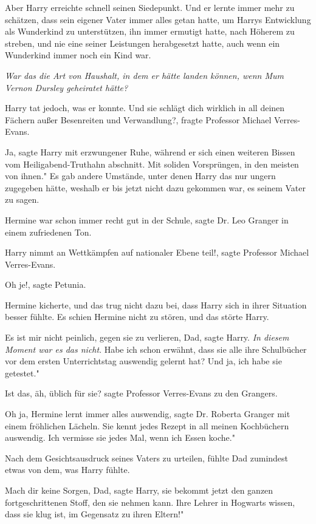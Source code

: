 Aber Harry erreichte schnell seinen Siedepunkt. Und er lernte immer mehr zu
schätzen, dass sein eigener Vater immer alles getan hatte, um Harrys Entwicklung
als Wunderkind zu unterstützen, ihn immer ermutigt hatte, nach Höherem zu
streben, und nie eine seiner Leistungen herabgesetzt hatte, auch wenn ein
Wunderkind immer noch ein Kind war.

\emph{War das die Art von Haushalt, in dem er hätte landen können, wenn Mum Vernon Dursley geheiratet hätte? }

Harry tat jedoch, was er konnte. \glqq Und sie schlägt dich wirklich in all
deinen Fächern außer Besenreiten und Verwandlung?\grqq{}, fragte Professor
Michael Verres-Evans.

\glqq Ja\grqq{}, sagte Harry mit erzwungener Ruhe, während er sich einen
weiteren Bissen vom Heiligabend-Truthahn abschnitt. \glqq Mit soliden
Vorsprüngen, in den meisten von ihnen." Es gab andere Umstände, unter denen
Harry das nur ungern zugegeben hätte, weshalb er bis jetzt nicht dazu gekommen
war, es seinem Vater zu sagen.

\glqq Hermine war schon immer recht gut in der Schule\grqq{}, sagte Dr. Leo
Granger in einem zufriedenen Ton.

\glqq Harry nimmt an Wettkämpfen auf nationaler Ebene teil!\grqq{}, sagte
Professor Michael Verres-Evans.

\glqq Oh je!\grqq{}, sagte Petunia.

Hermine kicherte, und das trug nicht dazu bei, dass Harry sich in ihrer
Situation besser fühlte. Es schien Hermine nicht zu stören, und das störte
Harry.

\glqq Es ist mir nicht peinlich, gegen sie zu verlieren, Dad\grqq{}, sagte
Harry.\emph{ In diesem Moment war es das nicht}. \glqq Habe ich schon erwähnt,
dass sie alle ihre Schulbücher vor dem ersten Unterrichtstag auswendig gelernt
hat? Und ja, ich habe sie getestet."

\glqq Ist das, äh, üblich für sie?\grqq{} sagte Professor Verres-Evans zu den
Grangers.

\glqq Oh ja, Hermine lernt immer alles auswendig\grqq{}, sagte Dr. Roberta
Granger mit einem fröhlichen Lächeln. \glqq Sie kennt jedes Rezept in all meinen
Kochbüchern auswendig. Ich vermisse sie jedes Mal, wenn ich Essen koche."

Nach dem Gesichtsausdruck seines Vaters zu urteilen, fühlte Dad zumindest etwas
von dem, was Harry fühlte.

\glqq Mach dir keine Sorgen, Dad\grqq{}, sagte Harry, \glqq sie bekommt jetzt
den ganzen fortgeschrittenen Stoff, den sie nehmen kann. Ihre Lehrer in Hogwarts
wissen, dass sie klug ist, im Gegensatz zu ihren Eltern!"

